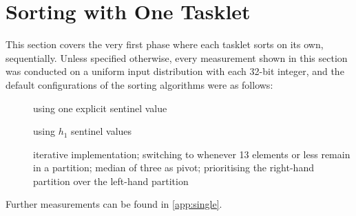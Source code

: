 \section{Sorting with One Tasklet}

This section covers the very first phase where each tasklet sorts on its own, \ie{} sequentially.
Unless specified otherwise, every measurement shown in this section was conducted on a uniform input distribution with each 32-bit integer, and the default configurations of the sorting algorithms were as follows:
\begin{description}
	\item[\IS{}]
	using one explicit sentinel value

	\item[\ShS{}]
	using \(h_1\) sentinel values

	\item[\QS{}]
	iterative implementation;
	switching to \IS{} whenever 13 elements or less remain in a partition;
	median of three as pivot;
	prioritising the right-hand partition over the left-hand partition
\end{description}
Further measurements can be found in \cref{app:single}.





